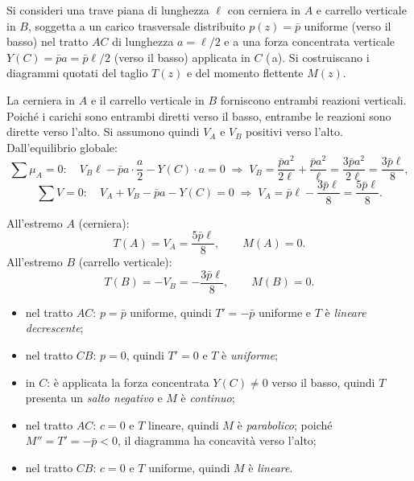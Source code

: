 \begin{esempio}
	Si consideri una trave piana di lunghezza $\ell$
	con cerniera in $A$ e carrello verticale in $B$,
	soggetta a un carico trasversale distribuito
	$p(z) = \bar{p}$ uniforme (verso il basso) nel
	tratto $AC$ di lunghezza $a = \ell/2$ e a una
	forza concentrata verticale $Y(C) = \bar{p}a
	= \bar{p}\ell/2$ (verso il basso) applicata in $C$ (\,a).
	Si costruiscano i diagrammi quotati del taglio $T(z)$
	e del momento flettente $M(z)$.
	
	\begin{svolgimento}
		
		




		
		La cerniera in $A$ e il carrello verticale in $B$
		forniscono entrambi reazioni verticali.
		Poiché i carichi sono entrambi diretti verso
		il basso, entrambe le reazioni sono dirette
		verso l'alto.
		Si assumono quindi $V_A$ e $V_B$ positivi
		verso l'alto.
		Dall'equilibrio globale:
		\[
		\sum \mu_A = 0:\quad
		V_B\ell - \bar{p}a\cdot\frac{a}{2} - Y(C)\cdot a = 0
		\;\Rightarrow\;
		V_B = \frac{\bar{p}a^2}{2\ell} + \frac{\bar{p}a^2}{\ell}
		= \frac{3\bar{p}a^2}{2\ell} = \frac{3\bar{p}\ell}{8},
		\]
		\[
		\sum V = 0:\quad
		V_A + V_B - \bar{p}a - Y(C) = 0
		\;\Rightarrow\;
		V_A = \bar{p}\ell - \frac{3\bar{p}\ell}{8}
		= \frac{5\bar{p}\ell}{8}.
		\]
		
		All'estremo $A$ (cerniera):
		\[
		T(A) = V_A = \frac{5\bar{p}\ell}{8}, \qquad M(A) = 0.
		\]
		All'estremo $B$ (carrello verticale):
		\[
		T(B) = -V_B = -\frac{3\bar{p}\ell}{8}, \qquad M(B) = 0.
		\]
		
		\begin{itemize}[nosep]
			\item nel tratto $AC$: $p = \bar{p}$ uniforme,
			quindi $T' = -\bar{p}$ uniforme e $T$ è
			\emph{lineare decrescente};
			\item nel tratto $CB$: $p = 0$, quindi $T' = 0$
			e $T$ è \emph{uniforme};
			\item in $C$: è applicata la forza concentrata
			$Y(C) \neq 0$ verso il basso, quindi $T$
			presenta un \emph{salto negativo} e $M$
			è \emph{continuo};
			\item nel tratto $AC$: $c = 0$ e $T$ lineare,
			quindi $M$ è \emph{parabolico}; poiché
			$M'' = T' = -\bar{p} < 0$, il diagramma
			ha concavità verso l'alto;
			\item nel tratto $CB$: $c = 0$ e $T$ uniforme,
			quindi $M$ è \emph{lineare}.
		\end{itemize}
		

\end{svolgimento}
\end{esempio}
